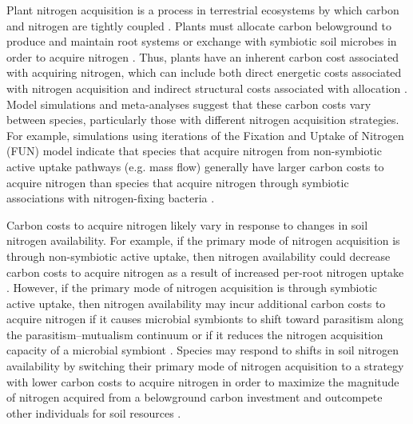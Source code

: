 Plant nitrogen acquisition is a process in terrestrial ecosystems by which carbon and nitrogen are tightly coupled . Plants must allocate carbon belowground to produce and maintain root systems or exchange with symbiotic soil microbes in order to acquire nitrogen . Thus, plants have an inherent carbon cost associated with acquiring nitrogen, which can include both direct energetic costs associated with nitrogen acquisition and indirect structural costs associated with allocation . Model simulations  and meta-analyses  suggest that these carbon costs vary between species, particularly those with different nitrogen acquisition strategies. For example, simulations using iterations of the Fixation and Uptake of Nitrogen (FUN) model indicate that species that acquire nitrogen from non-symbiotic active uptake pathways (e.g. mass flow) generally have larger carbon costs to acquire nitrogen than species that acquire nitrogen through symbiotic associations with nitrogen-fixing bacteria .

Carbon costs to acquire nitrogen likely vary in response to changes in soil nitrogen availability. For example, if the primary mode of nitrogen acquisition is through non-symbiotic active uptake, then nitrogen availability could decrease carbon costs to acquire nitrogen as a result of increased per-root nitrogen uptake . However, if the primary mode of nitrogen acquisition is through symbiotic active uptake, then nitrogen availability may incur additional carbon costs to acquire nitrogen if it causes microbial symbionts to shift toward parasitism along the parasitism–mutualism continuum  or if it reduces the nitrogen acquisition capacity of a microbial symbiont . Species may respond to shifts in soil nitrogen availability by switching their primary mode of nitrogen acquisition to a strategy with lower carbon costs to acquire nitrogen in order to maximize the magnitude of nitrogen acquired from a belowground carbon investment and outcompete other individuals for soil resources .


